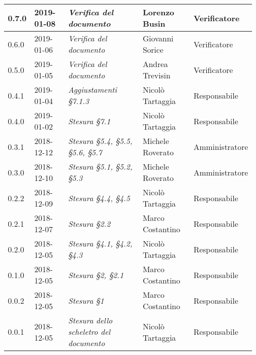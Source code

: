 \begin{longtable}{C{2cm}|C{2.5cm}|C{4.5cm}|C{2.5cm}|C{3cm}}
		0.7.0 & 2019-01-08 & \emph{Verifica del documento} & Lorenzo Busin & Verificatore \\
		\hline

		0.6.0 & 2019-01-06 & \emph{Verifica del documento} & Giovanni Sorice & Verificatore \\
		\hline

		0.5.0 & 2019-01-05 & \emph{Verifica del documento} & Andrea Trevisin & Verificatore \\
		\hline

		0.4.1 & 2019-01-04 & \emph{Aggiustamenti §7.1.3} & Nicolò Tartaggia & Responsabile \\
		\hline

		0.4.0 & 2019-01-02 & \emph{Stesura §7.1} & Nicolò Tartaggia & Responsabile \\
		\hline

		0.3.1 & 2018-12-12 & \emph{Stesura §5.4, §5.5, §5.6, §5.7} & Michele Roverato & Amministratore \\
		\hline

		0.3.0 & 2018-12-10 & \emph{Stesura §5.1, §5.2, §5.3} & Michele Roverato & Amministratore \\
		\hline

		0.2.2 & 2018-12-09 & \emph{Stesura §4.4, §4.5} & Nicolò Tartaggia & Responsabile \\
		\hline

		0.2.1 & 2018-12-07 & \emph{Stesura §2.2} & Marco Costantino & Responsabile \\
		\hline

		0.2.0 & 2018-12-05 & \emph{Stesura §4.1, §4.2, §4.3} & Nicolò Tartaggia & Responsabile \\
		\hline

		0.1.0 & 2018-12-05 & \emph{\textit{Stesura §2, §2.1}} & Marco Costantino & Responsabile \\
		\hline

		0.0.2 & 2018-12-05 & \emph{Stesura §1} & Marco Costantino & Responsabile \\
		\hline

		0.0.1 & 2018-12-05 & \emph{Stesura dello scheletro del documento} & Nicolò Tartaggia & Responsabile \\

	\end{longtable}

\clearpage
